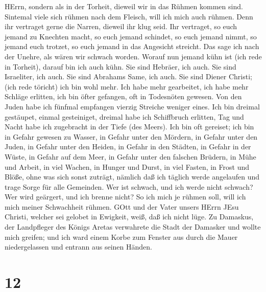 HErrn, sondern als in der Torheit, dieweil wir in das Rühmen kommen
sind.  Sintemal viele sich rühmen nach dem Fleisch, will
ich mich auch rühmen.  Denn ihr vertraget gerne die Narren,
dieweil ihr klug seid.  Ihr vertraget, so euch jemand zu
Knechten macht, so euch jemand schindet, so euch jemand nimmt, so jemand
euch trotzet, so euch jemand in das Angesicht streicht. 
Das sage ich nach der Unehre, als wären wir schwach worden. Worauf nun
jemand kühn ist (ich rede in Torheit), darauf bin ich auch kühn.
 Sie sind Hebräer, ich auch. Sie sind Israeliter, ich auch.
Sie sind Abrahams Same, ich auch.  Sie sind Diener Christi;
(ich rede töricht) ich bin wohl mehr. Ich habe mehr gearbeitet, ich habe
mehr Schläge erlitten, ich bin öfter gefangen, oft in Todesnöten
gewesen.  Von den Juden habe ich fünfmal empfangen vierzig
Streiche weniger eines.  Ich bin dreimal gestäupet, einmal
gesteiniget, dreimal habe ich Schiffbruch erlitten, Tag und Nacht habe
ich zugebracht in der Tiefe (des Meers).  Ich bin oft
gereiset; ich bin in Gefahr gewesen zu Wasser, in Gefahr unter den
Mördern, in Gefahr unter den Juden, in Gefahr unter den Heiden, in
Gefahr in den Städten, in Gefahr in der Wüste, in Gefahr auf dem Meer,
in Gefahr unter den falschen Brüdern,  in Mühe und Arbeit,
in viel Wachen, in Hunger und Durst, in viel Fasten, in Frost und Blöße,
 ohne was sich sonst zuträgt, nämlich daß ich täglich werde
angelaufen und trage Sorge für alle Gemeinden.  Wer ist
schwach, und ich werde nicht schwach? Wer wird geärgert, und ich brenne
nicht?  So ich mich je rühmen soll, will ich mich meiner
Schwachheit rühmen.  GOtt und der Vater unsers HErrn JEsu
Christi, welcher sei gelobet in Ewigkeit, weiß, daß ich nicht lüge.
 Zu Damaskus, der Landpfleger des Königs Aretas verwahrete
die Stadt der Damasker und wollte mich greifen;  und ich
ward einem Korbe zum Fenster aus durch die Mauer niedergelassen und
entrann aus seinen Händen.

\hypertarget{section-11}{%
\section{12}\label{section-11}}


